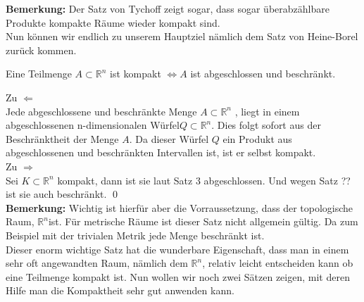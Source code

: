 	{\bf Bemerkung:} Der Satz von Tychoff zeigt sogar, dass sogar überabzählbare Produkte kompakte Räume wieder kompakt sind. \\
	
	Nun können wir endlich zu unserem Hauptziel nämlich dem Satz von Heine-Borel zurück kommen.
	
	\begin{Satz}
		Eine Teilmenge  \( A \subset \mathbb{R}^n \) ist kompakt \(\Leftrightarrow A \) ist abgeschlossen und beschränkt.
	\end{Satz}
		Zu \(\Leftarrow \) \\
		Jede abgeschlossene und beschränkte Menge \(A \subset\mathbb{R}^n \) , liegt in einem abgeschlossenen n-dimensionalen Würfel\( Q \subset \mathbb{R}^n \). Dies folgt sofort aus der 
		Beschränktheit der Menge \(A\). Da dieser Würfel \( Q \) ein Produkt aus abgeschlossenen und beschränkten Intervallen ist, ist er selbst kompakt.
		\\
		Zu \(\Rightarrow \) \\
		Sei \( K \subset \mathbb{R}^n \) kompakt, dann ist sie laut Satz 3 abgeschlossen. Und wegen Satz ?? ist sie auch beschränkt.
	\qed \\
	
	{\bf Bemerkung:} Wichtig ist hierfür aber die Vorraussetzung, dass der topologische Raum, \(\mathbb{R}^n \)ist. Für metrische Räume ist dieser Satz nicht allgemein gültig. 
	Da zum Beispiel mit der trivialen Metrik jede Menge beschränkt ist. \\
	
	Dieser enorm wichtige Satz hat die wunderbare Eigenschaft, dass man in einem sehr oft angewandten Raum, nämlich dem \(\mathbb{R}^n \), 
	relativ leicht entscheiden kann ob eine Teilmenge kompakt ist.  Nun wollen wir noch zwei Sätzen zeigen, mit deren Hilfe man die Kompaktheit sehr gut anwenden kann.
	